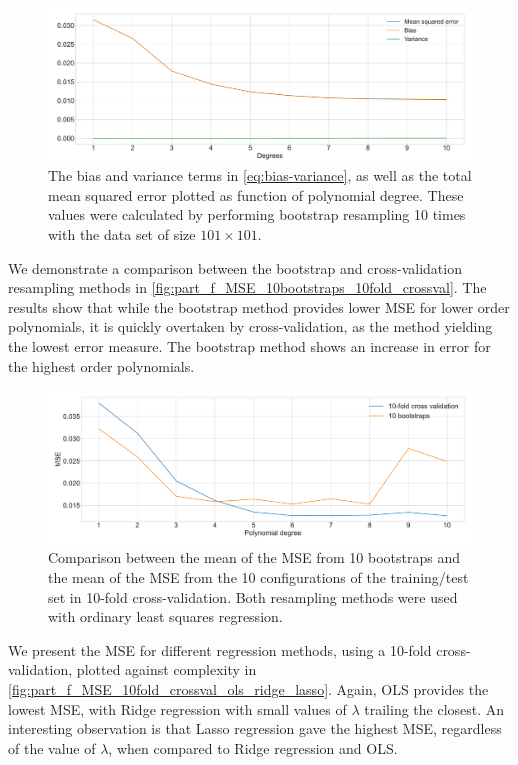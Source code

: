 \documentclass[12pt]{article}
\begin{document}
\begin{figure}
    \centering
    \includegraphics[width=1\linewidth]{images/part_e_bias_var_101x101.pdf}
    \caption{The bias and variance terms in \autoref{eq:bias-variance}, as well as the total mean squared error plotted as function of polynomial degree. These values were calculated by performing bootstrap resampling 10 times with the data set of size $101\times101$.}
    \label{fig:part_e_bias_var_101x101}
\end{figure}

We demonstrate a comparison between the bootstrap and cross-validation resampling methods in \autoref{fig:part_f_MSE_10bootstraps_10fold_crossval}. The results show that while the bootstrap method provides lower MSE for lower order polynomials, it is quickly overtaken by cross-validation, as the method yielding the lowest error measure. The bootstrap method shows an increase in error for the highest order polynomials. 

\begin{figure}
    \centering
    \includegraphics[width=1\linewidth]{images/part_f_MSE_10bootstraps_10fold_crossval.pdf}
    \caption{Comparison between the mean of the MSE from 10 bootstraps and the mean of the MSE from the 10 configurations of the training/test set in 10-fold cross-validation. Both resampling methods were used with ordinary least squares regression.}
    \label{fig:part_f_MSE_10bootstraps_10fold_crossval}
\end{figure}

We present the MSE for different regression methods, using a 10-fold cross-validation, plotted against complexity in \autoref{fig:part_f_MSE_10fold_crossval_ols_ridge_lasso}. Again, OLS provides the lowest MSE, with Ridge regression with small values of $\lambda$ trailing the closest. An interesting observation is that Lasso regression gave the highest MSE, regardless of the value of $\lambda$, when compared to Ridge regression and OLS. 
\end{document}
